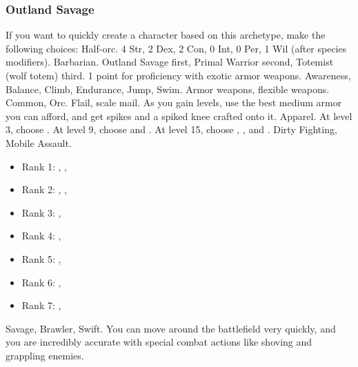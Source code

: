         \subsubsection{Outland Savage}
            If you want to quickly create a character based on this archetype, make the following choices:
             Half-orc.
             4 Str, 2 Dex, 2 Con, 0 Int, 0 Per, 1 Wil (after species modifiers).
             Barbarian.
             Outland Savage first, Primal Warrior second, Totemist (wolf totem) third.
             1 point for proficiency with exotic armor weapons.
             Awareness, Balance, Climb, Endurance, Jump, Swim.
             Armor weapons, flexible weapons.
             Common, Orc.
             Flail, scale mail. As you gain levels, use the best medium armor you can afford, and get spikes and a spiked knee crafted onto it.
             Apparel.
                At level 3, choose .
                At level 9, choose  and .
                At level 15, choose , , and .
             Dirty Fighting, Mobile Assault.
            \begin{itemize}
                \item Rank 1: , , 
                \item Rank 2: , , 
                \item Rank 3: , 
                \item Rank 4: , 
                \item Rank 5: , 
                \item Rank 6: , 
                \item Rank 7: , 
            \end{itemize}
             Savage, Brawler, Swift.
             You can move around the battlefield very quickly, and you are incredibly accurate with special combat actions like shoving and grappling enemies.
